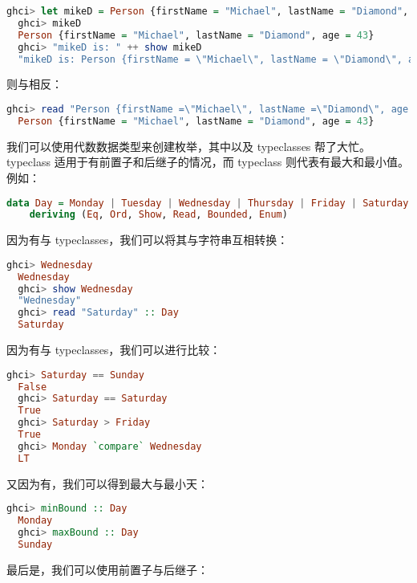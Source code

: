 \documentclass[./main.tex]{subfiles}
\begin{document}
\begin{lstlisting}[language=Haskell]
  ghci> let mikeD = Person {firstName = "Michael", lastName = "Diamond", age = 43}
  ghci> mikeD
  Person {firstName = "Michael", lastName = "Diamond", age = 43}
  ghci> "mikeD is: " ++ show mikeD
  "mikeD is: Person {firstName = \"Michael\", lastName = \"Diamond\", age = 43}"
\end{lstlisting}

则与相反：

\begin{lstlisting}[language=Haskell]
  ghci> read "Person {firstName =\"Michael\", lastName =\"Diamond\", age = 43}" :: Person
  Person {firstName = "Michael", lastName = "Diamond", age = 43}
\end{lstlisting}

我们可以使用代数数据类型来创建枚举，其中以及 typeclasses 帮了大忙。
 typeclass 适用于有前置子和后继子的情况，而 typeclass 则代表有最大和最小值。
例如：

\begin{lstlisting}[language=Haskell]
  data Day = Monday | Tuesday | Wednesday | Thursday | Friday | Saturday | Sunday
    deriving (Eq, Ord, Show, Read, Bounded, Enum)
\end{lstlisting}

因为有与 typeclasses，我们可以将其与字符串互相转换：

\begin{lstlisting}[language=Haskell]
  ghci> Wednesday
  Wednesday
  ghci> show Wednesday
  "Wednesday"
  ghci> read "Saturday" :: Day
  Saturday
\end{lstlisting}

因为有与 typeclasses，我们可以进行比较：

\begin{lstlisting}[language=Haskell]
  ghci> Saturday == Sunday
  False
  ghci> Saturday == Saturday
  True
  ghci> Saturday > Friday
  True
  ghci> Monday `compare` Wednesday
  LT
\end{lstlisting}

又因为有，我们可以得到最大与最小天：

\begin{lstlisting}[language=Haskell]
  ghci> minBound :: Day
  Monday
  ghci> maxBound :: Day
  Sunday
\end{lstlisting}

最后是，我们可以使用前置子与后继子：
\end{document}
